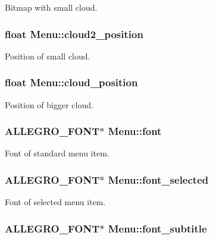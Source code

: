 \-Bitmap with small cloud. \hypertarget{structMenu_a143c3675204c7cf1381decbfe4be5476}{
\subsubsection[{cloud2\-\_\-position}]{\setlength{\rightskip}{0pt plus 5cm}float {\bf \-Menu\-::cloud2\-\_\-position}}}\label{structMenu_a143c3675204c7cf1381decbfe4be5476}
\-Position of small cloud. \hypertarget{structMenu_a0e6c60743147ff2ead1e0bb2f89d0036}{
\subsubsection[{cloud\-\_\-position}]{\setlength{\rightskip}{0pt plus 5cm}float {\bf \-Menu\-::cloud\-\_\-position}}}\label{structMenu_a0e6c60743147ff2ead1e0bb2f89d0036}
\-Position of bigger cloud. \hypertarget{structMenu_aa4e0229cb315ef9e0ea90263b26a37f8}{
\subsubsection[{font}]{\setlength{\rightskip}{0pt plus 5cm}\-A\-L\-L\-E\-G\-R\-O\-\_\-\-F\-O\-N\-T$\ast$ {\bf \-Menu\-::font}}}\label{structMenu_aa4e0229cb315ef9e0ea90263b26a37f8}
\-Font of standard menu item. \hypertarget{structMenu_a577ad17dfddafaae41dde63ca7970003}{
\subsubsection[{font\-\_\-selected}]{\setlength{\rightskip}{0pt plus 5cm}\-A\-L\-L\-E\-G\-R\-O\-\_\-\-F\-O\-N\-T$\ast$ {\bf \-Menu\-::font\-\_\-selected}}}\label{structMenu_a577ad17dfddafaae41dde63ca7970003}
\-Font of selected menu item. \hypertarget{structMenu_a18d7377e798bac336e55e253243d4e13}{
\subsubsection[{font\-\_\-subtitle}]{\setlength{\rightskip}{0pt plus 5cm}\-A\-L\-L\-E\-G\-R\-O\-\_\-\-F\-O\-N\-T$\ast$ {\bf \-Menu\-::font\-\_\-subtitle}}}\label{structMenu_a18d7377e798bac336e55e253243d4e13}

